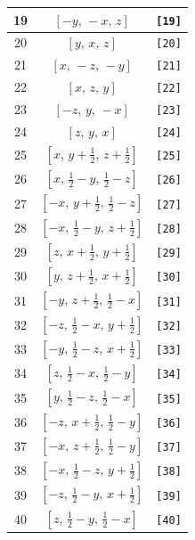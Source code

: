 \documentclass[fleqn,8pt]{jsarticle}
\begin{document}
\begin{longtable}{ccc}
19 & $\left[ - y,\, - x,\, z \right]$ & {\tt [19]} \\ \hline
20 & $\left[ y,\, x,\, z \right]$ & {\tt [20]} \\ \hline
21 & $\left[ x,\, - z,\, - y \right]$ & {\tt [21]} \\ \hline
22 & $\left[ x,\, z,\, y \right]$ & {\tt [22]} \\ \hline
23 & $\left[ - z,\, y,\, - x \right]$ & {\tt [23]} \\ \hline
24 & $\left[ z,\, y,\, x \right]$ & {\tt [24]} \\ \hline
25 & $\left[ x,\, y + \frac{1}{2},\, z + \frac{1}{2} \right]$ & {\tt [25]} \\ \hline
26 & $\left[ x,\, \frac{1}{2} - y,\, \frac{1}{2} - z \right]$ & {\tt [26]} \\ \hline
27 & $\left[ - x,\, y + \frac{1}{2},\, \frac{1}{2} - z \right]$ & {\tt [27]} \\ \hline
28 & $\left[ - x,\, \frac{1}{2} - y,\, z + \frac{1}{2} \right]$ & {\tt [28]} \\ \hline
29 & $\left[ z,\, x + \frac{1}{2},\, y + \frac{1}{2} \right]$ & {\tt [29]} \\ \hline
30 & $\left[ y,\, z + \frac{1}{2},\, x + \frac{1}{2} \right]$ & {\tt [30]} \\ \hline
31 & $\left[ - y,\, z + \frac{1}{2},\, \frac{1}{2} - x \right]$ & {\tt [31]} \\ \hline
32 & $\left[ - z,\, \frac{1}{2} - x,\, y + \frac{1}{2} \right]$ & {\tt [32]} \\ \hline
33 & $\left[ - y,\, \frac{1}{2} - z,\, x + \frac{1}{2} \right]$ & {\tt [33]} \\ \hline
34 & $\left[ z,\, \frac{1}{2} - x,\, \frac{1}{2} - y \right]$ & {\tt [34]} \\ \hline
35 & $\left[ y,\, \frac{1}{2} - z,\, \frac{1}{2} - x \right]$ & {\tt [35]} \\ \hline
36 & $\left[ - z,\, x + \frac{1}{2},\, \frac{1}{2} - y \right]$ & {\tt [36]} \\ \hline
37 & $\left[ - x,\, z + \frac{1}{2},\, \frac{1}{2} - y \right]$ & {\tt [37]} \\ \hline
38 & $\left[ - x,\, \frac{1}{2} - z,\, y + \frac{1}{2} \right]$ & {\tt [38]} \\ \hline
39 & $\left[ - z,\, \frac{1}{2} - y,\, x + \frac{1}{2} \right]$ & {\tt [39]} \\ \hline
40 & $\left[ z,\, \frac{1}{2} - y,\, \frac{1}{2} - x \right]$ & {\tt [40]} \\ \hline

\end{longtable}
\end{document}
